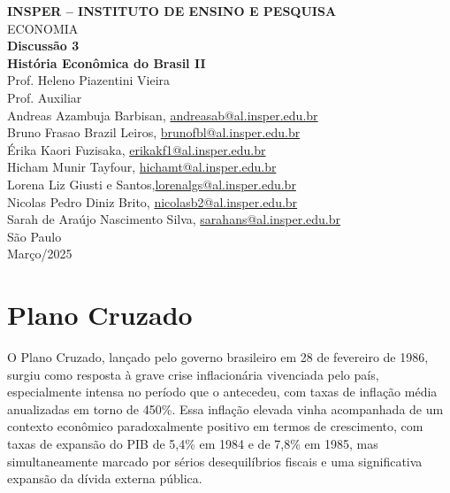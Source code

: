 \documentclass[a4paper,12pt]{article}[abntex2]
\begin{document}
\begin{titlepage}
    \centering
    \vspace*{1cm}
    \Large\textbf{INSPER – INSTITUTO DE ENSINO E PESQUISA}\\
    \Large ECONOMIA\\
    \vspace{1.5cm}
    \Large\textbf{Discussão 3}\\
    \textbf{História Econômica do Brasil II}\\
    \vspace{1.5cm}
    Prof. Heleno Piazentini Vieira \\
    Prof. Auxiliar  \\
    \vfill
    \normalsize
    Andreas Azambuja Barbisan, \href{mailto:andreasab@al.insper.edu.br}{andreasab@al.insper.edu.br}\\
    Bruno Frasao Brazil Leiros, \href{mailto:brunofbl@al.insper.edu.br}{brunofbl@al.insper.edu.br}\\
    Érika Kaori Fuzisaka, \href{mailto:erikakf1@al.insper.edu.br}{erikakf1@al.insper.edu.br}\\
    Hicham Munir Tayfour, \href{mailto:hichamt@al.insper.edu.br}{hichamt@al.insper.edu.br}\\
    Lorena Liz Giusti e Santos,\href{mailto:lorenalgs@al.insper.edu.br}{lorenalgs@al.insper.edu.br}\\
    Nicolas Pedro Diniz Brito, \href{mailto:nicolasb2@al.insper.edu.br}{nicolasb2@al.insper.edu.br}\\
    Sarah de Araújo Nascimento Silva, \href{mailto:sarahans@al.insper.edu.br}{sarahans@al.insper.edu.br}\\


    \vfill
    São Paulo\\
    Março/2025
\end{titlepage}

\newpage
\tableofcontents
\thispagestyle{empty} %

\newpage
\setcounter{page}{1} %
\justify
\onehalfspacing
\section{\textbf{Plano Cruzado}}

O Plano Cruzado, lançado pelo governo brasileiro em 28 de fevereiro de 1986, surgiu como resposta à grave crise inflacionária vivenciada pelo país, especialmente intensa no período que o antecedeu, com taxas de inflação média anualizadas em torno de 450\%. Essa inflação elevada vinha acompanhada de um contexto econômico paradoxalmente positivo em termos de crescimento, com taxas de expansão do PIB de 5,4\% em 1984 e de 7,8\% em 1985, mas simultaneamente marcado por sérios desequilíbrios fiscais e uma significativa expansão da dívida externa pública.
\end{document}
